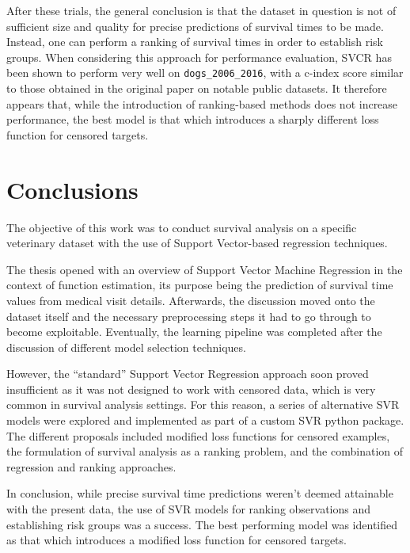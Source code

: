 \documentclass[12pt]{report}
\begin{document}
After these trials, the general conclusion is that the dataset in question is not of sufficient size and quality for precise predictions of survival times to be made. Instead, one can perform a ranking of survival times in order to establish risk groups. When considering this approach for performance evaluation, SVCR \cite{shivaswamy07} has been shown to perform very well on \texttt{dogs\_2006\_2016}, with a c-index score similar to those obtained in the original paper on notable public datasets. It therefore appears that, while the introduction of ranking-based methods does not increase performance, the best model is that which introduces a sharply different loss function for censored targets.

\chapter*{Conclusions}
\label{concl}
The objective of this work was to conduct survival analysis on a specific veterinary dataset with the use of Support Vector-based regression techniques.

The thesis opened with an overview of Support Vector Machine Regression in the context of function estimation, its purpose being the prediction of survival time values from medical visit details. Afterwards, the discussion moved onto the dataset itself and the necessary preprocessing steps it had to go through to become exploitable. Eventually, the learning pipeline was completed after the discussion of different model selection techniques.

However, the ``standard'' Support Vector Regression approach soon proved insufficient as it was not designed to work with censored data, which is very common in survival analysis settings. For this reason, a series of alternative SVR models were explored and implemented as part of a custom SVR python package. The different proposals included modified loss functions for censored examples, the formulation of survival analysis as a ranking problem, and the combination of regression and ranking approaches.

In conclusion, while precise survival time predictions weren't deemed attainable with the present data, the use of SVR models for ranking observations and establishing risk groups was a success. The best performing model was identified as that which introduces a modified loss function for censored targets.

%
%
 

% 
\end{document}
